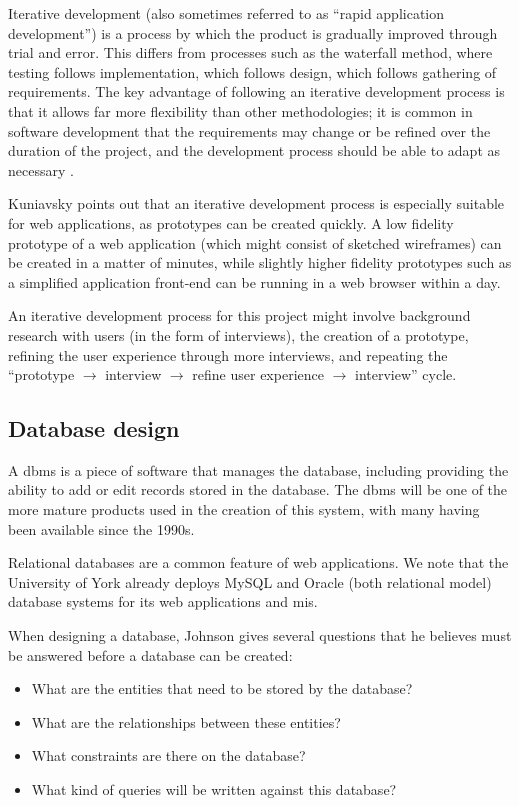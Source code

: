 \documentclass[draft]{scrartcl}
\begin{document}

Iterative development (also sometimes referred to as ``rapid application
development'') is a process by which the product is gradually improved through
trial and error. This differs from processes such as the waterfall method,
where testing follows implementation, which follows design, which follows
gathering of requirements. The key advantage of following an iterative
development process is that it allows far more flexibility than other
methodologies; it is common in software development that the requirements may
change or be refined over the duration of the project, and the development
process should be able to adapt as necessary \cite{kuniavsky2003userexperience}.

Kuniavsky points out that an iterative development process is especially
suitable for web applications, as prototypes can be created quickly. A low
fidelity prototype of a web application (which might consist of sketched
wireframes) can be created in a matter of minutes, while slightly higher
fidelity prototypes such as a simplified application front-end can be running
in a web browser within a day.

An iterative development process for this project might involve background
research with users (in the form of interviews), the creation of a prototype,
refining the user experience through more interviews, and repeating the
``prototype $\rightarrow$ interview $\rightarrow$ refine user experience
$\rightarrow$ interview'' cycle.

\subsection{Database design}

A \gls{dbms} is a piece of software that manages the
database, including providing the ability to add or edit records stored in the
database. The \gls{dbms} will be one of the more mature products used in the
creation of this system, with many having been available since the 1990s.

Relational databases are a common feature of web applications. We note
that the University of York already deploys MySQL and Oracle (both relational
model) database systems for its web applications and \gls{mis}.

When designing a database, Johnson \cite{DatabaseModelsLanguagesDesign} gives
several questions that he believes must be answered before a database can be
created:

\begin{itemize}
  \item What are the entities that need to be stored by the database?
  \item What are the relationships between these entities?
  \item What constraints are there on the database?
  \item What kind of queries will be written against this database?
\end{itemize}
\end{document}
